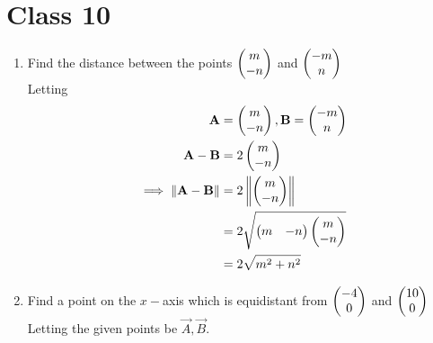 \documentclass[journal,12pt,twocolumn]{IEEEtran}
\renewcommand\thesection{\arabic{section}}
\begin{document}
\section{Class 10}
\renewcommand{\theequation}{\theenumi}
\begin{enumerate}[label=\thesection.\arabic*.,ref=\thesection.\theenumi]
\item  Find the distance between the points $\begin{pmatrix}m \\ -n\end{pmatrix}$ and $\begin{pmatrix}-m \\ n\end{pmatrix}$
	\\
		\solution Letting 
		\begin{align}
			\mathbf{A} &= \begin{pmatrix}m \\ -n\end{pmatrix}, \mathbf{B}=\begin{pmatrix}-m \\ n\end{pmatrix}
			\\
			\mathbf{A}-\mathbf{B} &= 2\begin{pmatrix}m \\ -n\end{pmatrix}
			\\
			\implies \left\lVert\mathbf{A}-\mathbf{B}\right\rVert &=2\left\lVert\begin{pmatrix}m \\ -n\end{pmatrix}\right\rVert
			\\
			&=2 \sqrt{\begin{pmatrix}m & -n\end{pmatrix}\begin{pmatrix}m \\ -n\end{pmatrix}} 
\\
			&			= 2 \sqrt{m^2+n^2}
		\end{align}
	\item Find a point on the $x-$axis which is equidistant from $\begin{pmatrix} -4 \\ 0\end{pmatrix}$ and $\begin{pmatrix}10 \\ 0\end{pmatrix}$
\\
\solution Letting the given points be $\vec{A},\vec{B}$. 

\begin{enumerate}


\end{enumerate}
\end{enumerate}
\end{document}
